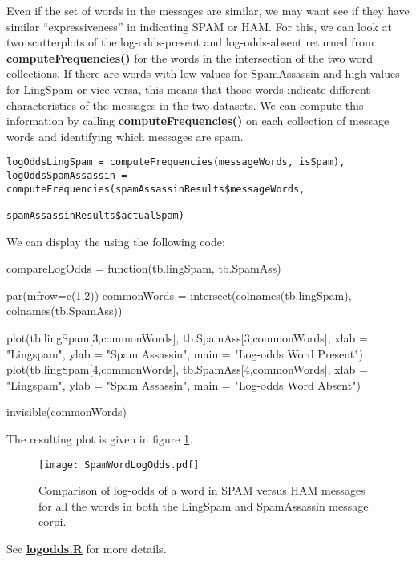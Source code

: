 \documentclass{article}
\def\SFunction#1{\textbf{#1()}}
\def\file#1{\HREF{http://winnie.ucdavis.edu/stat141/Winter04/Homework/NaieveBayes/Solutions/#1}{\textbf{#1}}}
\def\HREF#1#2{\href{#1}{#2}}
\begin{document}
Even if the set of words in the messages are similar,
we may want see if they have similar ``expressiveness'' in indicating
SPAM or HAM.  For this, we can look at two scatterplots of the
log-odds-present and log-odds-absent returned from
\SFunction{computeFrequencies} for the words in the intersection of
the two word collections.  If there are words with low values for
SpamAssassin and high values for LingSpam or vice-versa, this means
that those words indicate different characteristics of the messages in
the two datasets.  We can compute this information 
by calling \SFunction{computeFrequencies}
on each collection of message words and identifying
which messages are spam.
\begin{verbatim}
logOddsLingSpam = computeFrequencies(messageWords, isSpam),
logOddsSpamAssassin = computeFrequencies(spamAssassinResults$messageWords,
                                           spamAssassinResults$actualSpam)
\end{verbatim}



We can display the 
using the following code:
\begin{listing}[5]{1}
compareLogOdds =
function(tb.lingSpam, tb.SpamAss)
{
 par(mfrow=c(1,2))
 commonWords = intersect(colnames(tb.lingSpam), colnames(tb.SpamAss))
 
 plot(tb.lingSpam[3,commonWords], tb.SpamAss[3,commonWords],
       xlab = "Lingspam", ylab = "Spam Assassin", main = "Log-odds Word Present")
 plot(tb.lingSpam[4,commonWords], tb.SpamAss[4,commonWords],
        xlab = "Lingspam", ylab = "Spam Assassin", main = "Log-odds Word Absent")

 invisible(commonWords)
}
\end{listing}

The resulting plot is given in figure
\ref{fig:SpamWordLogOdds.pdf}.
\begin{figure}[htbp]
  \begin{center}
    \leavevmode
    \texttt{[image: SpamWordLogOdds.pdf]}
    \caption{Comparison of log-odds of a word in SPAM versus HAM messages for all the words in both the LingSpam and SpamAssassin message corpi.}
    \label{fig:SpamWordLogOdds.pdf}
  \end{center}
\end{figure}
See \file{logodds.R} for more details.
\end{document}
